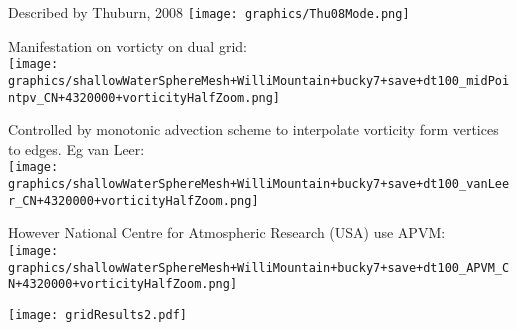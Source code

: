 \begin{slide}

\begin{minipage}{0.49\linewidth}\centering
Described by Thuburn, 2008
\texttt{[image: graphics/Thu08Mode.png]}
\pauseHS
\end{minipage}
\begin{minipage}{0.49\linewidth}
Manifestation on vorticty on dual grid:\\
\texttt{[image: graphics/shallowWaterSphereMesh+WilliMountain+bucky7+save+dt100\_midPointpv\_CN+4320000+vorticityHalfZoom.png]}
\pauseHS
\end{minipage}
\begin{minipage}{0.49\linewidth}\raggedright
Controlled by monotonic advection scheme to interpolate vorticity form vertices to edges. Eg van Leer:\\
\texttt{[image: graphics/shallowWaterSphereMesh+WilliMountain+bucky7+save+dt100\_vanLeer\_CN+4320000+vorticityHalfZoom.png]}
\pauseHS
\end{minipage}
\begin{minipage}{0.49\linewidth}\centering
However National Centre for Atmospheric Research (USA) use APVM:\\
\texttt{[image: graphics/shallowWaterSphereMesh+WilliMountain+bucky7+save+dt100\_APVM\_CN+4320000+vorticityHalfZoom.png]}
\end{minipage}

\end{slide}

\begin{slide}
\texttt{[image: gridResults2.pdf]}
\end{slide}
